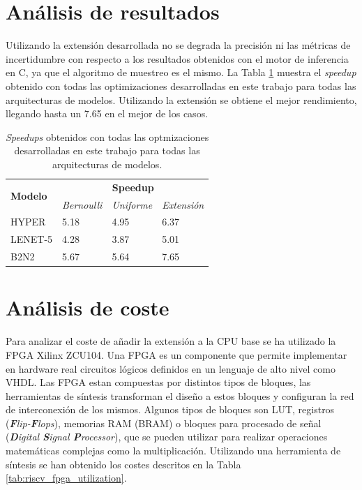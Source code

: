 
\section{Análisis de resultados}

Utilizando la extensión desarrollada no se degrada la precisión ni las métricas de incertidumbre con respecto a los resultados obtenidos con el motor de inferencia en C, ya que el algoritmo de muestreo es el mismo. La Tabla \ref{tab:riscv_speedup} muestra el \textit{speedup} obtenido con todas las optimizaciones desarrolladas en este trabajo para todas las arquitecturas de modelos. Utilizando la extensión se obtiene el mejor rendimiento, llegando hasta un 7.65 en el mejor de los casos.

\begin{table}[h]
    \centering
    \caption{\textit{Speedups} obtenidos con todas las optmizaciones desarrolladas en este trabajo para todas las arquitecturas de modelos.}
    \label{tab:riscv_speedup}
    \begin{tabular}{llll}
    \hline
    \multirow{2}{*}{\textbf{Modelo}} & \multicolumn{3}{c}{\textbf{Speedup}}\\
    & \textit{Bernoulli} & \textit{Uniforme} & \textit{Extensión}\\ \hline
    HYPER& 5.18 & 4.95 & 6.37 \\
    LENET-5& 4.28 & 3.87 & 5.01 \\
    B2N2& 5.67 & 5.64 & 7.65 \\ \hline
    \end{tabular}
\end{table}

\section{Análisis de coste}

Para analizar el coste de añadir la extensión a la CPU base se ha utilizado la FPGA Xilinx ZCU104. Una FPGA es un componente que permite implementar en hardware real circuitos lógicos definidos en un lenguaje de alto nivel como VHDL. Las FPGA estan compuestas por distintos tipos de bloques, las herramientas de síntesis transforman el diseño a estos bloques y configuran la red de interconexión de los mismos. Algunos tipos de bloques son LUT, registros (\textit{\textbf{F}lip-\textbf{F}lops}), memorias RAM (BRAM) o bloques para procesado de señal (\textit{\textbf{D}igital \textbf{S}ignal \textbf{P}rocessor}), que se pueden utilizar para realizar operaciones matemáticas complejas como la multiplicación. Utilizando una herramienta de síntesis se han obtenido los costes descritos en la Tabla \ref{tab:riscv_fpga_utilization}.

